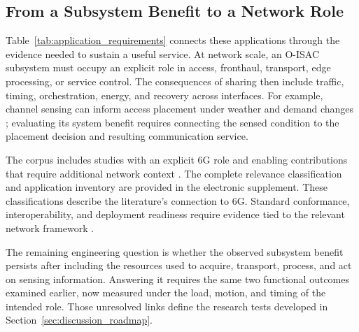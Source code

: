 \subsection{From a Subsystem Benefit to a Network Role}

Table~\ref{tab:application_requirements} connects these applications through
the evidence needed to sustain a useful service. At network scale, an O-ISAC
subsystem must occupy an explicit role in access, fronthaul, transport, edge
processing, or service control. The consequences of sharing then include
traffic, timing, orchestration, energy, and recovery across interfaces. For
example, channel sensing can inform access placement under weather and demand
changes \cite{OISAC_SCR00922}; evaluating its system benefit requires connecting
the sensed condition to the placement decision and resulting communication
service.

The corpus includes studies with an explicit 6G role
\cite{OISAC_SCR00362,OISAC_SCR01049} and enabling contributions that require
additional network context \cite{OISAC_SCR00007,OISAC_SCR00647}. The complete
relevance classification and application inventory are provided in the
electronic supplement. These classifications describe the literature's
connection to 6G. Standard conformance, interoperability, and deployment
readiness require evidence tied to the relevant network framework
\cite{ITUR_M2160_2023}.

The remaining engineering question is whether the observed subsystem benefit
persists after including the resources used to acquire, transport, process,
and act on sensing information. Answering it requires the same two functional
outcomes examined earlier, now measured under the load, motion, and timing of
the intended role. Those unresolved links define the research tests developed
in Section~\ref{sec:discussion_roadmap}.
